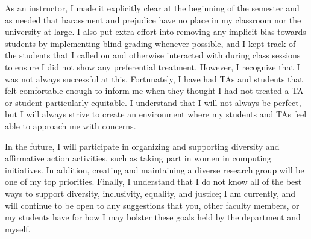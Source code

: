 As an instructor, I made it explicitly clear at the beginning of the semester and as needed that harassment and prejudice have no place in my classroom nor the university at large. I also put extra effort into removing any implicit bias towards students by implementing blind grading whenever possible, and I kept track of the students that I called on and otherwise interacted with during class sessions to ensure I did not show any preferential treatment. However, I recognize that I was not always successful at this. Fortunately, I have had TAs and students that felt comfortable enough to inform me when they thought I had not treated a TA or student particularly equitable. I understand that I will not always be perfect, but I will always strive to create an environment where my students and TAs feel able to approach me with concerns.

In the future, I will participate in organizing and supporting diversity and affirmative action activities, such as taking part in women in computing initiatives. In addition, creating and maintaining a diverse research group will be one of my top priorities. Finally, I understand that I do not know all of the best ways to support diversity, inclusivity, equality, and justice; I am currently, and will continue to be open to any suggestions that you, other faculty members, or my students have for how I may bolster these goals held by the department and myself.

\label{diversity_last}
